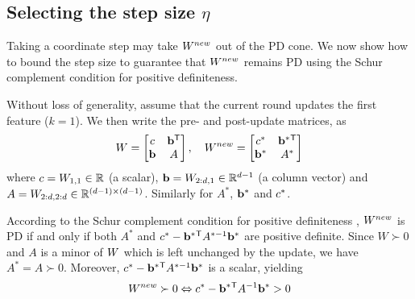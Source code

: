 \documentclass{article}
\begin{document}
\subsection{Selecting the step size $\eta$}\label{subsec:step}
Taking a coordinate step may take ${{W^{new}}}$ out of the PD cone. We now show how to bound the step size to guarantee that ${{W^{new}}}$ remains PD using the Schur complement condition for positive definiteness.

Without loss of generality, assume that the current round updates
the first feature ($k = 1$).  We then write the pre- and post-update
matrices, as
\begin{equation}
  {W} = \left[ \begin{matrix} c & \mathbf{b}{}^\mathsf{T} \\ \mathbf{b} & A \end{matrix} \right],
  \quad
  {{W^{new}}} = \left[ \begin{matrix} c^* & \mathbf{b}^*{}^\mathsf{T} \\ \mathbf{b}^* & A^* \end{matrix} \right]
  \label{schurNotationPreUpdate}
\end{equation}
 where $c = {W}_{1,1} \in \mathbb{R}$ (a scalar), $\mathbf{b} = {W}_{2:d,1} \in
\mathbb{R}^{d-1}$ (a column vector) and $A = {W}_{2:d,2:d} \in \mathbb{R}^{(d-1)
\times (d-1)}$. Similarly for $A^*$, $\mathbf{b}^*$ and $c^*$.


According to the Schur complement condition for positive definiteness
\citep[p. 650]{boyd2004convex}, ${{W^{new}}}$ is PD if and only if both
$A^*$ and $c^* - \mathbf{b}^*{}^\mathsf{T} A^{*-1} \mathbf{b}^*$ are positive definite.
Since $W \succ 0$ and $A$ is a minor of ${W}$ which is left unchanged by the update, we have $A^* =
A \succ 0$.  Moreover, $c^* - \mathbf{b}^*{}^\mathsf{T} A^{*-1} \mathbf{b}^*$ is a
scalar, yielding
\begin{equation}
  {{W^{new}}} \succ  0 \Leftrightarrow  c^* - \mathbf{b}^*{}^\mathsf{T} A^{-1} \mathbf{b}^* >  0
  \label{schurCond}
\end{equation}
%
\end{document}
